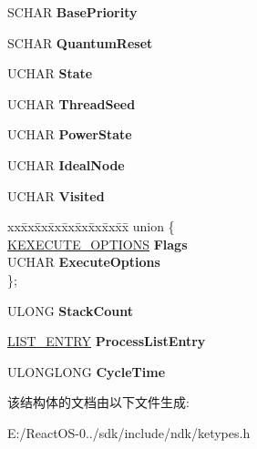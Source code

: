 \begin{DoxyCompactItemize}
\begin{tabbing}
\end{tabbing}\item 
\mbox{\label{struct___k_p_r_o_c_e_s_s_a0dda0998f810e950251fc5fd570957f9}} 
S\+C\+H\+AR {\bfseries Base\+Priority}
\item 
\mbox{\label{struct___k_p_r_o_c_e_s_s_a10c07bea2755adadea51c72effb979ff}} 
S\+C\+H\+AR {\bfseries Quantum\+Reset}
\item 
\mbox{\label{struct___k_p_r_o_c_e_s_s_a9766a9ecb17478201428fcfb480e9dbf}} 
U\+C\+H\+AR {\bfseries State}
\item 
\mbox{\label{struct___k_p_r_o_c_e_s_s_a35bb62eebaa159df08012e72424b1f26}} 
U\+C\+H\+AR {\bfseries Thread\+Seed}
\item 
\mbox{\label{struct___k_p_r_o_c_e_s_s_ac7effe421de13b687c5e31142cc0c1a6}} 
U\+C\+H\+AR {\bfseries Power\+State}
\item 
\mbox{\label{struct___k_p_r_o_c_e_s_s_a36d76c8edb74ddc308852b1db9b3fb6f}} 
U\+C\+H\+AR {\bfseries Ideal\+Node}
\item 
\mbox{\label{struct___k_p_r_o_c_e_s_s_a8a31793da3ed0ceab5723771bfaeebb3}} 
U\+C\+H\+AR {\bfseries Visited}
\item 
\mbox{\label{struct___k_p_r_o_c_e_s_s_acb5321cd643dac2e60f719f84a140e7d}} 
\begin{tabbing}
xx\=xx\=xx\=xx\=xx\=xx\=xx\=xx\=xx\=\kill
union \{\\
\>\hyperlink{struct___k_e_x_e_c_u_t_e___o_p_t_i_o_n_s}{KEXECUTE\_OPTIONS} {\bfseries Flags}\\
\>UCHAR {\bfseries ExecuteOptions}\\
\}; \\

\end{tabbing}\item 
\mbox{\label{struct___k_p_r_o_c_e_s_s_a28c82d84d70bc5156354e611afde4905}} 
U\+L\+O\+NG {\bfseries Stack\+Count}
\item 
\mbox{\label{struct___k_p_r_o_c_e_s_s_a159f393b4a4f8fc7c65bc21b2fa6f8c4}} 
\hyperlink{struct___l_i_s_t___e_n_t_r_y}{L\+I\+S\+T\+\_\+\+E\+N\+T\+RY} {\bfseries Process\+List\+Entry}
\item 
\mbox{\label{struct___k_p_r_o_c_e_s_s_a9197a55f3e9dcbca6c043956ce846ff2}} 
U\+L\+O\+N\+G\+L\+O\+NG {\bfseries Cycle\+Time}
\end{DoxyCompactItemize}


该结构体的文档由以下文件生成\+:\begin{DoxyCompactItemize}
\item 
E\+:/\+React\+O\+S-\/0../sdk/include/ndk/ketypes.\+h\end{DoxyCompactItemize}
